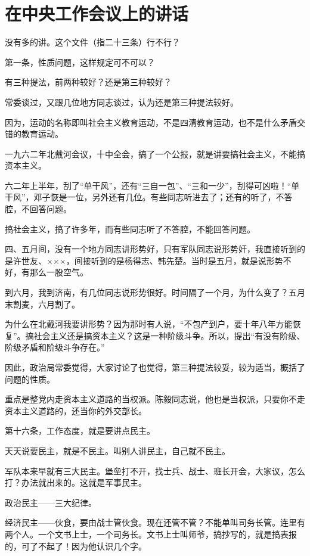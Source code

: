 \section[在中央工作会议上的讲话（一九六四年十二月二十八日）]{在中央工作会议上的讲话}


没有多的讲。这个文件（指二十三条）行不行？

第一条，性质问题，这样规定可不可以？

有三种提法，前两种较好？还是第三种较好？

常委谈过，又跟几位地方同志谈过，认为还是第三种提法较好。

因为，运动的名称即叫社会主义教育运动，不是四清教育运动，也不是什么矛盾交错的教育运动。

一九六二年北戴河会议，十中全会，搞了一个公报，就是讲要搞社会主义，不能搞资本主义。

六二年上半年，刮了“单干风”，还有“三自一包”、“三和一少”，刮得可凶啦！“单干风”，邓子恢是一位，另外还有几位。有些同志听进去了；还有的听了，不答腔，不回答问题。

搞社会主义，搞了许多年，而有些同志听了不答腔，不能回答问题。

四、五月间，没有一个地方同志讲形势好，只有军队同志说形势奸，我直接听到的是许世友、×××，间接听到的是杨得志、韩先楚。当时是五月，就是说形势不好，有那么一股空气。

到六月，我到济南，有几位同志说形势很好。时间隔了一个月，为什么变了？五月末割麦，六月割了。

为什么在北戴河我要讲形势？因为那时有人说，“不包产到户，要十年八年方能恢复”。搞社会主义还是搞资本主义？这是一种阶级斗争。所以，提出“有没有阶级、阶级矛盾和阶级斗争存在。”

因此，政治局常委觉得，大家讨论了也觉得，第三种提法较妥，较为适当，概括了问题的性质。

重点是整党内走资本主义道路的当权派。陈毅同志说，他也是当权派，只要你不走资本主义道路的，还当你的外交部长。

第十六条，工作态度，就是要讲点民主。

天天说要民主，就是不民主。叫别人讲民主，自己就不民主。

军队本来早就有三大民主。堡垒打不开，找士兵、战士、班长开会，大家议，怎么打？办法就出来的。这就是军事民主。

政治民主——三大纪律。

经济民主——伙食，要由战士管伙食。现在还管不管？不能单叫司务长管。连里有两个人。一个文书上士，一个司务长。文书上士叫师爷，搞抄写的，就是搞表报的，可了不起了！因为他认识几个字。

